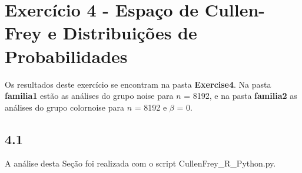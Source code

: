 
\section*{\large Exercício 4 - Espaço de Cullen-Frey e Distribuições de Probabilidades}
%

Os resultados deste exercício se encontram na pasta \textbf{Exercise4}. Na pasta \textbf{familia1} estão as análises do grupo noise para $n$ = 8192, e na pasta \textbf{familia2} as análises do grupo colornoise para $n$ = 8192 e $\beta$ = 0.

\subsection*{4.1} 
%

A análise desta Seção foi realizada com o script CullenFrey\_R\_Python.py.

\begin{figure}[ht!]
	\vspace{0mm}	%
	\begin{center}
	\end{center}
	\vspace{-2mm}	%
	\label{ex4_fig1}
\end{figure}

